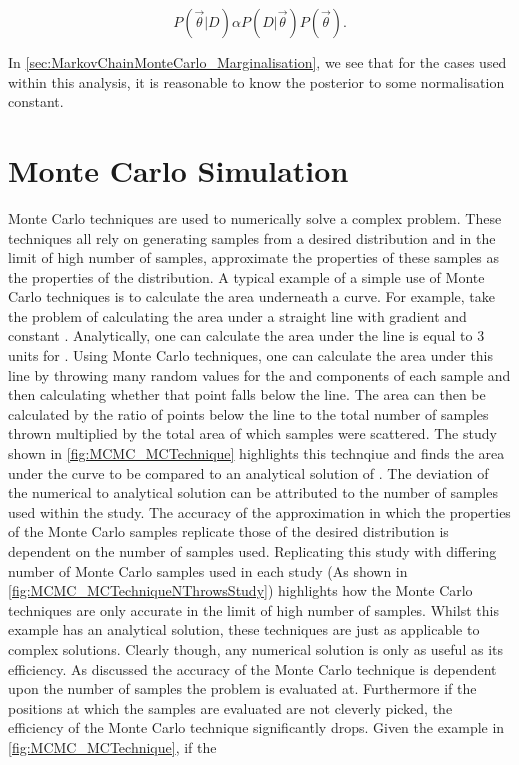 \begin{equation}
  P(\vec{\theta}|D) \alpha P(D|\vec{\theta}) P(\vec{\theta}).
\end{equation}

In \autoref{sec:MarkovChainMonteCarlo_Marginalisation}, we see that for the cases used within this analysis, it is reasonable to know the posterior to some normalisation constant.

\section{Monte Carlo Simulation}
\label{sec:MarkovChainMonteCarlo_MonteCarloSimulation}
Monte Carlo techniques are used to numerically solve a complex problem. These techniques all rely on generating samples from a desired distribution and in the limit of high number of samples, approximate the properties of these samples as the properties of the distribution. A typical example of a simple use of Monte Carlo techniques is to calculate the area underneath a curve. For example, take the problem of calculating the area under a straight line with gradient  and constant . Analytically, one can calculate the area under the line is equal to 3 units for . Using Monte Carlo techniques, one can calculate the area under this line by throwing many random values for the  and  components of each sample and then calculating whether that point falls below the line. The area can then be calculated by the ratio of points below the line to the total number of samples thrown multiplied by the total area of which samples were scattered. The study shown in \autoref{fig:MCMC_MCTechnique} highlights this technqiue and finds the area under the curve to be  compared to an analytical solution of . The deviation of the numerical to analytical solution can be attributed to the number of samples used within the study. The accuracy of the approximation in which the properties of the Monte Carlo samples replicate those of the desired distribution is dependent on the number of samples used. Replicating this study with differing number of Monte Carlo samples used in each study (As shown in \autoref{fig:MCMC_MCTechniqueNThrowsStudy}) highlights how the Monte Carlo techniques are only accurate in the limit of high number of samples. Whilst this example has an analytical solution, these techniques are just as applicable to complex solutions. Clearly though, any numerical solution is only as useful as its efficiency. As discussed the accuracy of the Monte Carlo technique is dependent upon the number of samples the problem is evaluated at. Furthermore if the positions at which the samples are evaluated are not cleverly picked, the efficiency of the Monte Carlo technique significantly drops. Given the example in \autoref{fig:MCMC_MCTechnique}, if the 